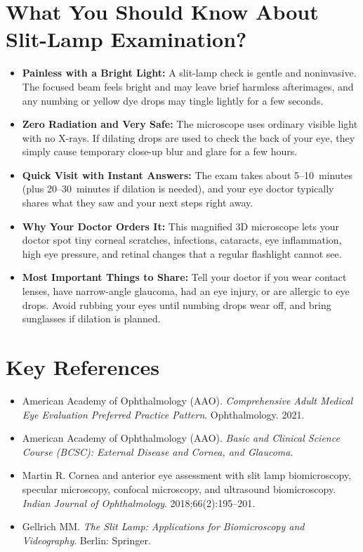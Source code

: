 \section{What You Should Know About Slit-Lamp Examination?}

\begin{itemize}
    \item \textbf{Painless with a Bright Light:} A slit-lamp check is gentle and noninvasive. The focused beam feels bright and may leave brief harmless afterimages, and any numbing or yellow dye drops may tingle lightly for a few seconds.
    \item \textbf{Zero Radiation and Very Safe:} The microscope uses ordinary visible light with no X-rays. If dilating drops are used to check the back of your eye, they simply cause temporary close-up blur and glare for a few hours.
    \item \textbf{Quick Visit with Instant Answers:} The exam takes about 5--10~minutes (plus 20--30~minutes if dilation is needed), and your eye doctor typically shares what they saw and your next steps right away.
    \item \textbf{Why Your Doctor Orders It:} This magnified 3D microscope lets your doctor spot tiny corneal scratches, infections, cataracts, eye inflammation, high eye pressure, and retinal changes that a regular flashlight cannot see.
    \item \textbf{Most Important Things to Share:} Tell your doctor if you wear contact lenses, have narrow-angle glaucoma, had an eye injury, or are allergic to eye drops. Avoid rubbing your eyes until numbing drops wear off, and bring sunglasses if dilation is planned.
\end{itemize}

\section{Key References}

\begin{itemize}
    \item American Academy of Ophthalmology (AAO). \textit{Comprehensive Adult Medical Eye Evaluation Preferred Practice Pattern}. Ophthalmology. 2021.
    \item American Academy of Ophthalmology (AAO). \textit{Basic and Clinical Science Course (BCSC): External Disease and Cornea, and Glaucoma}.
    \item Martin R. Cornea and anterior eye assessment with slit lamp biomicroscopy, specular microscopy, confocal microscopy, and ultrasound biomicroscopy. \textit{Indian Journal of Ophthalmology}. 2018;66(2):195--201.
    \item Gellrich MM. \textit{The Slit Lamp: Applications for Biomicroscopy and Videography}. Berlin: Springer.
\end{itemize}
